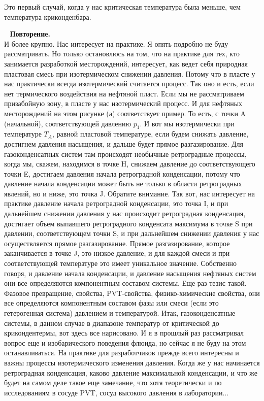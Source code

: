 \documentclass[main.tex]{subfiles}
\begin{document}
Это первый случай, когда у нас критическая температура была меньше, чем температура криконденбара.

\ \newline
\textbf{Повторение.}\\
И более крупно.
Нас интересует на практике.
Я опять подробно не буду рассматривать.
Но только остановлюсь на том, что на практике для тех, кто занимается разработкой месторождений, интересует, как ведет себя природная пластовая смесь при изотермическом снижении давления.
Потому что в пласте у нас практически всегда изотермический считается процесс.
Так оно и есть, если нет термического воздействия на нефтяной пласт.
Если мы не рассматриваем призабойную зону, в пласте у нас изотермический процесс.
И для нефтяных месторождений на этом рисунке (а) соответствует пример.
То есть, с точки A (начальной), соответствующей давлению $p_1$.
И вот мы изотермически при температуре $T_A$, равной пластовой температуре, если будем снижать давление, достигнем давления насыщения, и дальше будет прямое разгазирование.
Для газоконденсатных систем там происходят необычные ретроградные процессы, когда мы, скажем, находимся в точке H, снижаем давление до соответствующего точки E, достигаем давления начала ретроградной конденсации, потому что давление начала конденсации может быть не только в области ретроградных явлений, но и ниже, это точка J.
Обратите внимание.
Так вот, нас интересует на практике давление начала ретроградной конденсации, это точка I, и при дальнейшем снижении давления у нас происходит ретроградная конденсация, достигает объем выпавшего ретроградного конденсата максимума в точке S при давлении, соответствующем точки S, и при дальнейшем снижении давления у нас осуществляется прямое разгазирование.
Прямое разгазирование, которое заканчивается в точке J, это низкое давление, и для каждой смеси и при соответствующей температуре это имеет уникальное значение.
Собственно говоря, и давление начала конденсации, и давление насыщения нефтяных систем они все определяются компонентным составом системы.
Еще раз тезис такой.
Фазовое превращение, свойства, PVT-свойства, физико-химические свойства, они все определяются компонентным составом фазы или смеси (если это гетерогенная система) давлением и температурой.
Итак, газоконденсатные системы, в данном случае в диапазоне температур от критической до крикондентермы, вот здесь все нарисовано.
И я в прошлый раз рассматривал вопрос еще и изобарического поведения флюида, но сейчас я не буду на этом останавливаться.
На практике для разработчиков прежде всего интересны и важны процессы изотермического изменения давления.
Когда же у нас начинается ретроградная конденсация, каково давление максимальной конденсации, и что же будет на самом деле такое еще замечание, что хотя теоретически и по исследованиям в сосуде PVT, сосуд высокого давления в лаборатории...
\end{document}
